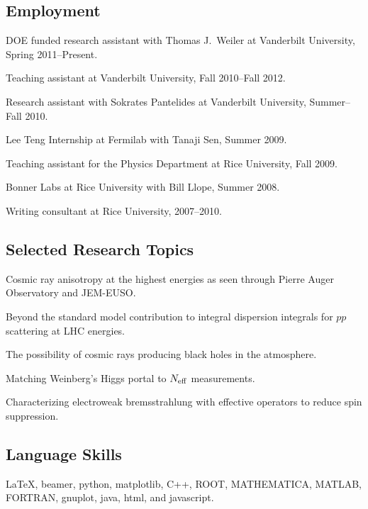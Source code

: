 \documentclass[letterpaper]{article}
\renewenvironment{itemize}{
\begin{list}{}{
\setlength{\leftmargin}{1.5em}
}
}{
\end{list}
}
\begin{document}
\subsection*{Employment}
\begin{itemize}
\item DOE funded research assistant with Thomas J.~Weiler at Vanderbilt University, Spring 2011--Present.
\item Teaching assistant at Vanderbilt University, Fall 2010--Fall 2012.
\item Research assistant with Sokrates Pantelides at Vanderbilt University, Summer--Fall 2010.
\item Lee Teng Internship at Fermilab with Tanaji Sen, Summer 2009.
\item Teaching assistant for the Physics Department at Rice University, Fall 2009.
\item Bonner Labs at Rice University with Bill Llope, Summer 2008.
\item Writing consultant at Rice University, 2007--2010.
\end{itemize}

\subsection*{Selected Research Topics}
\begin{itemize}
\item Cosmic ray anisotropy at the highest energies as seen through Pierre Auger Observatory and JEM-EUSO.
\item Beyond the standard model contribution to integral dispersion integrals for $pp$ scattering at LHC energies.
\item The possibility of cosmic rays producing black holes in the atmosphere.
\item Matching Weinberg's Higgs portal to $N_{\rm{eff}}$ measurements.
\item Characterizing electroweak bremsstrahlung with effective operators to reduce spin suppression.
\end{itemize}

\subsection*{Language Skills}
\begin{itemize}
\item 
\LaTeX, beamer, python, matplotlib, C++, ROOT, MATHEMATICA, MATLAB, FORTRAN, gnuplot, java, html, and javascript.
\end{itemize}
\end{document}
